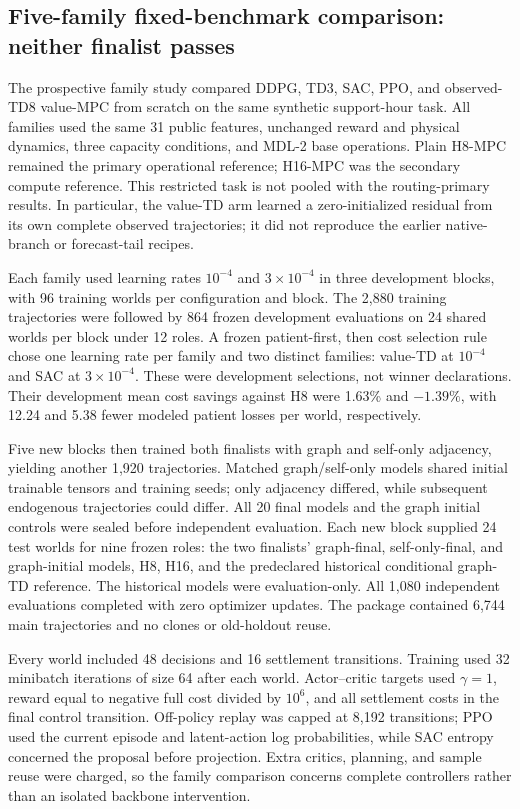\documentclass[preprint,review,12pt]{elsarticle}
\begin{document}
\subsection{Five-family fixed-benchmark comparison: neither finalist passes}
\label{sec:family-selection-development}
The prospective family study compared DDPG, TD3, SAC, PPO, and observed-TD8
value-MPC from scratch on the same synthetic support-hour task. All families
used the same 31 public features, unchanged reward and physical dynamics,
three capacity conditions, and MDL-2 base operations. Plain H8-MPC remained
the primary operational reference; H16-MPC was the secondary compute reference.
This restricted task is not pooled with the routing-primary results.
In particular, the value-TD arm learned a zero-initialized residual from its
own complete observed trajectories; it did not reproduce the earlier
native-branch or forecast-tail recipes.

Each family used learning rates $10^{-4}$ and $3\times10^{-4}$ in three
development blocks, with 96 training worlds per configuration and block.
The 2,880 training trajectories were followed by 864 frozen development
evaluations on 24 shared worlds per block under 12 roles. A frozen
patient-first, then cost selection rule chose one learning rate per family
and two distinct families: value-TD at $10^{-4}$ and SAC at
$3\times10^{-4}$. These were development selections, not winner declarations.
Their development mean cost savings against H8 were 1.63\% and $-1.39\%$,
with 12.24 and 5.38 fewer modeled patient losses per world, respectively.

Five new blocks then trained both finalists with graph and self-only
adjacency, yielding another 1,920 trajectories. Matched graph/self-only
models shared initial trainable tensors and training seeds; only adjacency
differed, while subsequent endogenous trajectories could differ. All 20
final models and the graph initial controls were sealed before independent
evaluation. Each new block supplied 24 test worlds for nine frozen roles:
the two finalists' graph-final, self-only-final, and graph-initial models,
H8, H16, and the predeclared historical conditional graph-TD reference.
The historical models were evaluation-only. All 1,080 independent evaluations
completed with zero optimizer updates. The package contained 6,744 main
trajectories and no clones or old-holdout reuse.

Every world included 48 decisions and 16 settlement transitions. Training
used 32 minibatch iterations of size 64 after each world. Actor--critic
targets used $\gamma=1$, reward equal to negative full cost divided by
$10^6$, and all settlement costs in the final control transition. Off-policy
replay was capped at 8,192 transitions; PPO used the current episode and
latent-action log probabilities, while SAC entropy concerned the proposal
before projection. Extra critics, planning, and sample reuse were charged,
so the family comparison concerns complete controllers rather than an
isolated backbone intervention.
\end{document}
